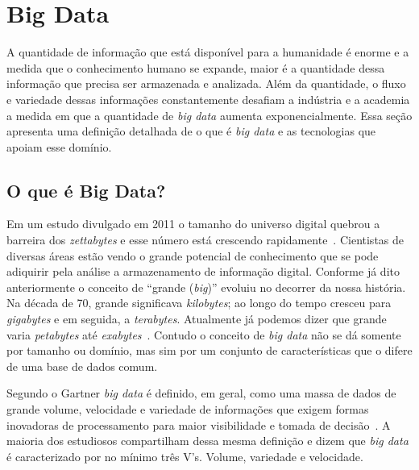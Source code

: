 \section{Big Data}


A quantidade de informação que está disponível para a humanidade é enorme e a medida que o conhecimento humano se expande, maior é a quantidade dessa informação que precisa ser armazenada e analizada. Além da quantidade, o fluxo e variedade dessas informações constantemente desafiam a indústria e a academia a medida em que a quantidade de \textit{big  data} aumenta exponencialmente. Essa seção apresenta uma definição detalhada de o que é \textit{big data} e as tecnologias que apoiam esse domínio.

\subsection{O que é Big Data?}

Em um estudo divulgado em 2011 o tamanho do universo digital quebrou a barreira dos \textit{zettabytes} e esse número está crescendo rapidamente~\cite{emcuniversedigital}. Cientistas de diversas áreas estão vendo o grande potencial de conhecimento que se pode adiquirir pela análise a armazenamento de informação digital. Conforme já dito anteriormente o conceito de ``grande (\textit{big})''  evoluiu no decorrer da nossa história. Na década de 70, grande significava \emph{kilobytes}; ao longo do tempo cresceu para \emph{gigabytes} e em seguida, a \emph{terabytes}. Atualmente já podemos dizer que grande varia \emph{petabytes}  até \emph{exabytes}~\cite{WNextBigData}. Contudo  o  conceito de \textit{big data} não se dá somente por tamanho ou domínio, mas sim por um conjunto de características que o difere de uma base de dados comum.

Segundo o Gartner \emph{big data} é definido, em geral, como uma massa de dados de grande volume, velocidade e variedade de informações que exigem formas inovadoras de processamento para maior visibilidade e tomada de decisão~\cite{conceitoGartner}. A maioria dos estudiosos compartilham dessa mesma definição e dizem que \textit{big data} é caracterizado por no mínimo três V's. Volume, variedade e  velocidade.~\cite{ibmbigdatavvv,fromdbtobigdata}

